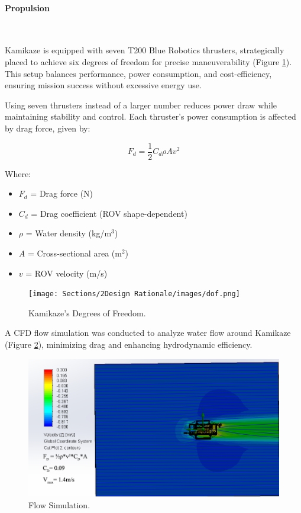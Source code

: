 \vspace{-0.3cm}
\paragraph{Propulsion} \ \\
\vspace{-0.5cm}

Kamikaze is equipped with seven T200 Blue Robotics thrusters, strategically placed to achieve six degrees of freedom for precise maneuverability (Figure \ref{fig:dof}). This setup balances performance, power consumption, and cost-efficiency, ensuring mission success without excessive energy use.

\hspace{10pt} Using seven thrusters instead of a larger number reduces power draw while maintaining stability and control. Each thruster's power consumption is affected by drag force, given by:

\begin{equation}
    F_d = \frac{1}{2} C_d \rho A v^2
    \label{eq:drag_force}
\end{equation}

Where:

\vspace{-0.5\baselineskip}
\begin{itemize}
    \setlength{\itemsep}{0pt}
    \item \(F_d\) = Drag force (N)
    \item \(C_d\) = Drag coefficient (ROV shape-dependent)
    \item \(\rho\) = Water density (kg/m\(^3\))
    \item \(A\) = Cross-sectional area (m\(^2\))
    \item \(v\) = ROV velocity (m/s)
\end{itemize}

\begin{figure}[h]
    \centering
    \texttt{[image: Sections/2Design Rationale/images/dof.png]}
    \caption{Kamikaze’s Degrees of Freedom.}
    \label{fig:dof}
\end{figure}

A CFD flow simulation was conducted to analyze water flow around Kamikaze (Figure \ref{fig:cfd}), minimizing drag and enhancing hydrodynamic efficiency.

\begin{figure}[h]
    \centering
    \includegraphics[width=0.9\columnwidth]{Sections/2Design Rationale/images/Stream lines.png}
    \caption{Flow Simulation.}
    \label{fig:cfd}
\end{figure}

